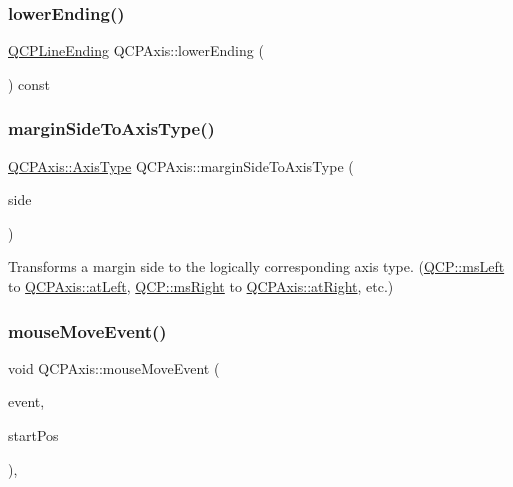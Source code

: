 \subsubsection{\texorpdfstring{lower\+Ending()}{lowerEnding()}}
{\footnotesize\ttfamily \hyperlink{class_q_c_p_line_ending}{Q\+C\+P\+Line\+Ending} Q\+C\+P\+Axis\+::lower\+Ending (\begin{DoxyParamCaption}{ }\end{DoxyParamCaption}) const}

\mbox{\label{class_q_c_p_axis_ac0a6b77bd52bec6c81cd62d167cfeba6}} 
\subsubsection{\texorpdfstring{margin\+Side\+To\+Axis\+Type()}{marginSideToAxisType()}}
{\footnotesize\ttfamily \hyperlink{class_q_c_p_axis_ae2bcc1728b382f10f064612b368bc18a}{Q\+C\+P\+Axis\+::\+Axis\+Type} Q\+C\+P\+Axis\+::margin\+Side\+To\+Axis\+Type (\begin{DoxyParamCaption}\item[{\hyperlink{namespace_q_c_p_a7e487e3e2ccb62ab7771065bab7cae54}{Q\+C\+P\+::\+Margin\+Side}}]{side }\end{DoxyParamCaption})\hspace{0.3cm}{\ttfamily [static]}}

Transforms a margin side to the logically corresponding axis type. (\hyperlink{namespace_q_c_p_a7e487e3e2ccb62ab7771065bab7cae54a9500c8bfcc9e80b9dff0a8e00e867f07}{Q\+C\+P\+::ms\+Left} to \hyperlink{class_q_c_p_axis_ae2bcc1728b382f10f064612b368bc18aaf84aa6cac6fb6099f54a2cbf7546b730}{Q\+C\+P\+Axis\+::at\+Left}, \hyperlink{namespace_q_c_p_a7e487e3e2ccb62ab7771065bab7cae54a93c719593bb2b94ed244d52c86d83b65}{Q\+C\+P\+::ms\+Right} to \hyperlink{class_q_c_p_axis_ae2bcc1728b382f10f064612b368bc18aadf5509f7d29199ef2f263b1dd224b345}{Q\+C\+P\+Axis\+::at\+Right}, etc.) \mbox{\label{class_q_c_p_axis_a2a89a13440eec099fc2327c2672be0cd}} 
\subsubsection{\texorpdfstring{mouse\+Move\+Event()}{mouseMoveEvent()}}
{\footnotesize\ttfamily void Q\+C\+P\+Axis\+::mouse\+Move\+Event (\begin{DoxyParamCaption}\item[{Q\+Mouse\+Event $\ast$}]{event,  }\item[{const Q\+PointF \&}]{start\+Pos }\end{DoxyParamCaption})\hspace{0.3cm}{\ttfamily [protected]}, {\ttfamily [virtual]}}

